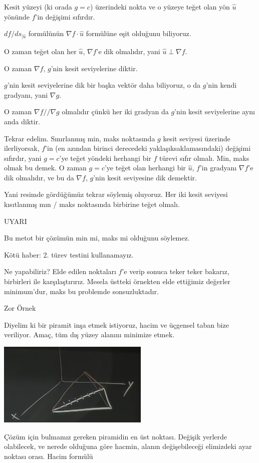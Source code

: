 \documentclass[12pt,fleqn]{article}\usepackage{../../common}
\begin{document}
Kesit yüzeyi (ki orada $g=c$) üzerindeki nokta ve o yüzeye teğet olan yön
$\hat{u}$ yönünde $f$'in değişimi sıfırdır. 

$df / ds_{|\hat{u}}$ formülünün $\nabla f \cdot \hat{u}$ formülüne eşit olduğunu 
 biliyoruz. 

O zaman teğet olan her $\hat{u}$, $\nabla f$'e dik olmalıdır, yani $\hat{u} 
\perp \nabla f$. 

O zaman $\nabla f$, $g$'nin kesit seviyelerine diktir. 

$g$'nin kesit seviyelerine dik bir başka vektör daha biliyoruz, o 
da $g$'nin kendi gradyanı, yani $\nabla g$. 

O zaman $\nabla f // \nabla g$ olmalıdır çünkü her iki gradyan da $g$'nin
kesit seviyelerine aynı anda diktir. 

Tekrar edelim. Sınırlanmış min, maks noktasında $g$ kesit seviyesi üzerinde
ilerliyorsak, $f$'in (en azından birinci derecedeki yaklaşıksaklamasındaki)
değişimi sıfırdır, yani $g=c$'ye teğet yöndeki herhangi bir $f$ türevi sıfır
olmalı. Min, maks olmak bu demek. O zaman $g=c$'ye teğet olan herhangi bir
$\hat{u}$, $f$'in gradyanı $\nabla f$'e dik olmalıdır, ve bu da $\nabla f$,
$g$'nin kesit seviyesine dik demektir. 

Yani resimde gördüğümüz tekrar söylemiş oluyoruz. Her iki kesit seviyesi
kısıtlanmış mın / maks noktasında birbirine teğet olmalı.

UYARI

Bu metot bir çözümün min mi, maks mi olduğunu söylemez. 

Kötü haber: 2. türev testini kullanamayız. 

Ne yapabiliriz? Elde edilen noktaları $f$'e verip sonuca teker teker
bakarız, birbirleri ile karşılaştırırız. Mesela üstteki örnekten elde
ettiğimiz değerler minimum'dur, maks bu problemde sonsuzluktadır.

Zor Örnek

Diyelim ki bir piramit inşa etmek istiyoruz, hacim ve üçgensel taban bize
veriliyor. Amaç, tüm dış yüzey alanını minimize etmek. 
\begin{center}
\includegraphics[height=4cm]{13_8.png}
\end{center}
Çözüm için bulmamız gereken piramidin en üst noktası. Değişik yerlerde
olabilecek, ve nerede olduğuna göre hacmin, alanın değişebileceği
elimizdeki ayar noktası orası. Hacim formülü
\end{document}
